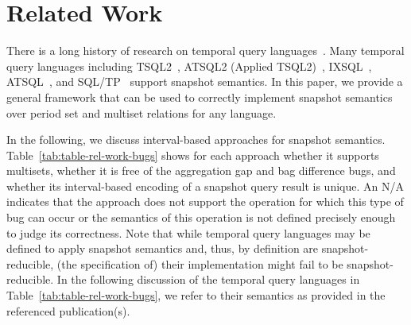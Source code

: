 \section{Related Work}
\label{sec:related-work}

%
There is a long history of research on temporal query
languages~\cite{DBLP:reference/db/JensenS09r,DBLP:reference/db/BohlenGJS09}.
Many temporal query languages including
TSQL2~\cite{Snodgrass95,DBLP:journals/sigmod/SnodgrassAABCDEGJKKKLLRSSS94},
\mbox{ATSQL2} (Applied TSQL2)~\cite{Bohlen95evaluatingand},
IXSQL~\cite{LorentzosM97}, ATSQL~\cite{BohlenJS00}, and
SQL/TP~\cite{T98} support snapshot semantics.  In this paper, %
we provide a general
framework that can be used to correctly implement snapshot semantics
over period set and multiset relations for any language.

In the following, we discuss interval-based approaches for snapshot
semantics.
%
Table~\ref{tab:table-rel-work-bugs} shows for each approach whether it
supports multisets, whether it is free of the aggregation gap and bag
difference bugs, and whether its interval-based encoding of a
snapshot query result is unique. An N/A indicates that the approach
does not support the operation for which this type of bug can occur or
the semantics of this operation is not defined precisely enough to
judge its correctness.  Note that while temporal query languages may
be defined to apply snapshot semantics and, thus, by definition are
snapshot-reducible, (the specification of) their implementation might
fail to be snapshot-reducible.  In the following discussion of the
temporal query languages in Table~\ref{tab:table-rel-work-bugs}, we
refer to their semantics as provided in the referenced publication(s).

